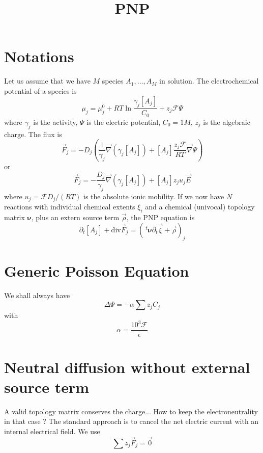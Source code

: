 \documentclass{revtex4}
\newcommand{\trn}{\!\!~^t}
\begin{document}
	\title{PNP}
	\maketitle
	
\section{Notations}
Let us assume that we have $M$ species $A_1,\ldots,A_M$ in solution.
The electrochemical potential of a species is
\begin{equation}
	\mu_j = \mu^{0}_j + RT \ln \dfrac{\gamma_j[A_j]}{C_0} + z_j\mathcal{F}\Psi
\end{equation}
where $\gamma_j$ is the activity, $\Psi$ is the electric potential, $C_0=1M$, $z_j$ is the algebraic charge.
The flux is
\begin{equation}
	\vec{F}_j = -D_j 
	\left( 
		\dfrac{1}{\gamma_j} \vec{\nabla} \left( \gamma_j [A_j] \right) + 
		[A_j] \dfrac{z_j\mathcal{F}}{RT} \vec{\nabla}\Psi
	\right)
\end{equation}
or
\begin{equation}
	\vec{F}_j = - \dfrac{D_j}{\gamma_j} \vec{\nabla} \left( \gamma_j [A_j] \right) + [A_j] z_j u_j \vec{E}
\end{equation}
where $u_j = \mathcal{F}D_j/(RT)$ is the absolute ionic mobility.
If we now have $N$ reactions with individual chemical extents $\xi_i$ and
a chemical (univocal) topology matrix $\pmb{\nu}$, plus an extern source term $\vec{\rho}$, the PNP equation is
\begin{equation}
	\partial_t [A_j] + \mathrm{div}\vec{F}_j = \left(\trn\pmb{\nu} \partial_t \vec{\xi} + \vec{\rho}\right)_j
\end{equation}

\section{Generic Poisson Equation}
We shall always have
\begin{equation}
	\Delta \Psi = - \alpha\sum z_j C_j
\end{equation}
with
$$
	\alpha = \dfrac{10^3\mathcal{F}}{\epsilon}
$$

\section{Neutral diffusion without external source term}
A valid topology matrix conserves the charge...
How to keep the electroneutrality in that case ?
The standard approach is to cancel the net electric current with an internal electrical field.
We use
$$
	\sum z_j \vec{F}_j = \vec{0}
$$
\end{document}
